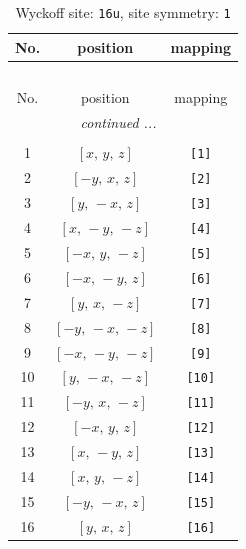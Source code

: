 \documentclass[fleqn,8pt]{jsarticle}
\begin{document}
\begin{longtable}{ccc}
\caption{Wyckoff site: {\tt 16u}, site symmetry: {\tt 1}}
 \\
 \hline \hline
No. & position & mapping \\ \hline \endfirsthead

\multicolumn{2}{l}{\tablename\ \thetable{}} \\
 \hline \hline
No. & position & mapping \\ \hline \endhead

 \hline \hline
\multicolumn{2}{r}{\footnotesize\it continued ...} \\ \endfoot

 \hline \hline
\multicolumn{2}{r}{} \\ \endlastfoot

1 & $\left[ x,\, y,\, z \right]$ & {\tt [1]} \\ \hline
2 & $\left[ - y,\, x,\, z \right]$ & {\tt [2]} \\ \hline
3 & $\left[ y,\, - x,\, z \right]$ & {\tt [3]} \\ \hline
4 & $\left[ x,\, - y,\, - z \right]$ & {\tt [4]} \\ \hline
5 & $\left[ - x,\, y,\, - z \right]$ & {\tt [5]} \\ \hline
6 & $\left[ - x,\, - y,\, z \right]$ & {\tt [6]} \\ \hline
7 & $\left[ y,\, x,\, - z \right]$ & {\tt [7]} \\ \hline
8 & $\left[ - y,\, - x,\, - z \right]$ & {\tt [8]} \\ \hline
9 & $\left[ - x,\, - y,\, - z \right]$ & {\tt [9]} \\ \hline
10 & $\left[ y,\, - x,\, - z \right]$ & {\tt [10]} \\ \hline
11 & $\left[ - y,\, x,\, - z \right]$ & {\tt [11]} \\ \hline
12 & $\left[ - x,\, y,\, z \right]$ & {\tt [12]} \\ \hline
13 & $\left[ x,\, - y,\, z \right]$ & {\tt [13]} \\ \hline
14 & $\left[ x,\, y,\, - z \right]$ & {\tt [14]} \\ \hline
15 & $\left[ - y,\, - x,\, z \right]$ & {\tt [15]} \\ \hline
16 & $\left[ y,\, x,\, z \right]$ & {\tt [16]} \\
\end{longtable}
\end{document}
